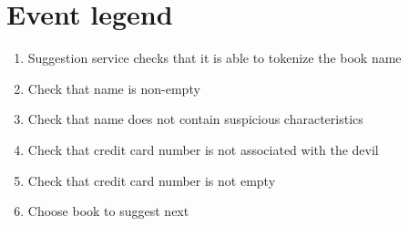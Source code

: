 \documentclass[a4paper]{article}
\begin{document}
\section{Event legend}
\begin{enumerate}[label=\Alph* -]
\item Suggestion service checks that it is able to tokenize the book name
\item Check that name is non-empty
\item Check that name does not contain suspicious characteristics
\item Check that credit card number is not associated with the devil
\item Check that credit card number is not empty
\item Choose book to suggest next
\end{enumerate}
\end{document}
